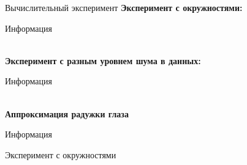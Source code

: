 \documentclass[10pt,pdf,hyperref={unicode}]{beamer}
\begin{document}
\begin{frame}{Вычислительный эксперимент}
\justifying
\textbf{Эксперимент с окружностями:}

Информация

~\\
\textbf{Эксперимент с разным уровнем шума в данных:}

Информация

~\\
\textbf{Аппроксимация радужки глаза}

Информация

\end{frame}

\begin{frame}{Эксперимент с окружностями}
\justifying


\end{frame}
\end{document}
